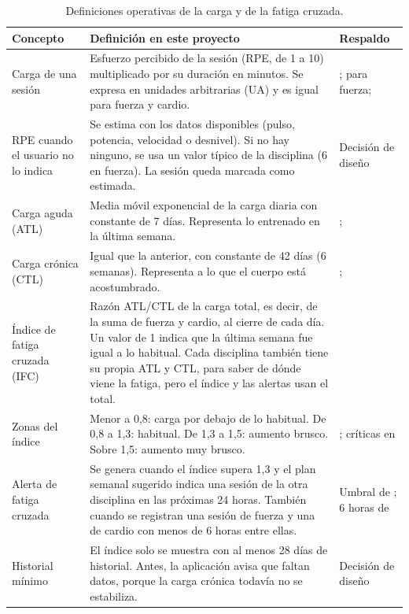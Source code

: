 \begin{table}[h!]
    \centering
    \renewcommand{\arraystretch}{1.3}
    \small
    \begin{tabular}{|>{\raggedright\arraybackslash}p{3.1cm}|>{\raggedright\arraybackslash}p{7.9cm}|>{\raggedright\arraybackslash}p{3.7cm}|}
        \hline
        \rowcolor[HTML]{EFEFEF}
        \textbf{Concepto} & \textbf{Definición en este proyecto} & \textbf{Respaldo} \\ \hline
        Carga de una sesión & Esfuerzo percibido de la sesión (RPE, de 1 a 10) multiplicado por su duración en minutos. Se expresa en unidades arbitrarias (UA) y es igual para fuerza y cardio. & \citet{foster2001monitoring}; \citet{day2004monitoring} para fuerza; \citet{haddad2017session} \\ \hline
        RPE cuando el usuario no lo indica & Se estima con los datos disponibles (pulso, potencia, velocidad o desnivel). Si no hay ninguno, se usa un valor típico de la disciplina (6 en fuerza). La sesión queda marcada como estimada. & Decisión de diseño \\ \hline
        Carga aguda (ATL) & Media móvil exponencial de la carga diaria con constante de 7 días. Representa lo entrenado en la última semana. & \citet{williams2017better}; \citet{gabbett2016training} \\ \hline
        Carga crónica (CTL) & Igual que la anterior, con constante de 42 días (6 semanas). Representa a lo que el cuerpo está acostumbrado. & \citet{williams2017better}; \citet{gabbett2016training} \\ \hline
        Índice de fatiga cruzada (IFC) & Razón ATL/CTL de la carga total, es decir, de la suma de fuerza y cardio, al cierre de cada día. Un valor de 1 indica que la última semana fue igual a lo habitual. Cada disciplina también tiene su propia ATL y CTL, para saber de dónde viene la fatiga, pero el índice y las alertas usan el total. & \citet{gabbett2016training} \\ \hline
        Zonas del índice & Menor a 0,8: carga por debajo de lo habitual. De 0,8 a 1,3: habitual. De 1,3 a 1,5: aumento brusco. Sobre 1,5: aumento muy brusco. & \citet{gabbett2016training}; críticas en \citet{impellizzeri2020acute} \\ \hline
        Alerta de fatiga cruzada & Se genera cuando el índice supera 1,3 y el plan semanal sugerido indica una sesión de la otra disciplina en las próximas 24 horas. También cuando se registran una sesión de fuerza y una de cardio con menos de 6 horas entre ellas. & Umbral de \citet{gabbett2016training}; 6 horas de \citet{aptavs2025concurrente} \\ \hline
        Historial mínimo & El índice solo se muestra con al menos 28 días de historial. Antes, la aplicación avisa que faltan datos, porque la carga crónica todavía no se estabiliza. & Decisión de diseño \\ \hline
    \end{tabular}
    \caption{Definiciones operativas de la carga y de la fatiga cruzada.}
    \label{tab:def_operativas}
\end{table}


